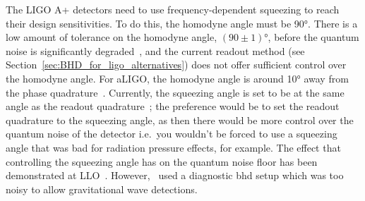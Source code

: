\par
The LIGO A+ detectors need to use frequency-dependent squeezing to reach their design sensitivities. To do this, the homodyne angle must be \ang{90}. There is a low amount of tolerance on the homodyne angle, $(90\pm1)\si{\degree}$, before the quantum noise is significantly degraded~\cite{eric_oelker_2021}, and the current readout method (see Section~\ref{sec:BHD_for_ligo_alternatives}) does not offer sufficient control over the homodyne angle. For aLIGO, the homodyne angle is around \ang{10} away from the phase quadrature~\cite{BHD_angle_2020}. Currently, the squeezing angle is set to be at the same angle as the readout quadrature~\cite{Tse2019}; the preference would be to set the readout quadrature to the squeezing angle, as then there would be more control over the quantum noise of the detector i.e.~you wouldn't be forced to use a squeezing angle that was bad for radiation pressure effects, for example. The effect that controlling the squeezing angle has on the quantum noise floor has been demonstrated at LLO~\cite{Yu2020}. However,~\cite{Yu2020} used a diagnostic \gls{bhd} setup which was too noisy to allow gravitational wave detections. 
\par
